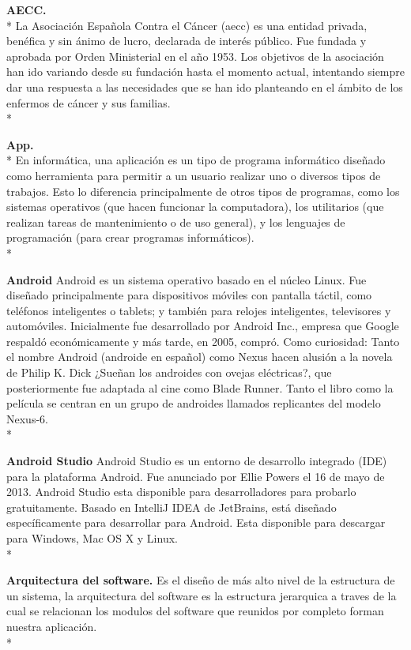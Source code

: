 \documentclass[../pfc.tex]{subfiles}
\begin{document}
	
	\textbf{AECC.}\\*
	La Asociación Española Contra el Cáncer (aecc) es una entidad privada, benéfica y sin ánimo de lucro, declarada de interés público. Fue fundada y aprobada por Orden Ministerial en el año 1953.
	Los objetivos de la asociación han ido variando desde su fundación hasta el momento actual, intentando siempre dar una respuesta a las necesidades que se han ido planteando en el ámbito de los enfermos de cáncer y sus familias.\\*
	
	\textbf{App.}\\*
	En informática, una aplicación es un tipo de programa informático diseñado como herramienta para permitir a un usuario realizar uno o diversos tipos de trabajos. Esto lo diferencia principalmente de otros tipos de programas, como los sistemas operativos (que hacen funcionar la computadora), los utilitarios (que realizan tareas de mantenimiento o de uso general), y los lenguajes de programación (para crear programas informáticos).\\*
	
	\textbf{Android}
	Android es un sistema operativo basado en el núcleo Linux. Fue diseñado principalmente para dispositivos móviles con pantalla táctil, como teléfonos inteligentes o tablets; y también para relojes inteligentes, televisores y automóviles. Inicialmente fue desarrollado por Android Inc., empresa que Google respaldó económicamente y más tarde, en 2005, compró. Como curiosidad: Tanto el nombre Android (androide en español) como Nexus hacen alusión a la novela de Philip K. Dick ¿Sueñan los androides con ovejas eléctricas?, que posteriormente fue adaptada al cine como Blade Runner. Tanto el libro como la película se centran en un grupo de androides llamados replicantes del modelo Nexus-6.\\*
	
	\textbf{Android Studio}
	Android Studio es un entorno de desarrollo integrado (IDE) para la plataforma Android. Fue anunciado por Ellie Powers el 16 de mayo de 2013. Android Studio esta disponible para desarrolladores para probarlo gratuitamente. Basado en IntelliJ IDEA de JetBrains, está diseñado específicamente para desarrollar para Android. Esta disponible para descargar para Windows, Mac OS X y Linux.\\*
	
	\textbf{Arquitectura del software.}
	Es el diseño de más alto nivel de la estructura de un sistema, la arquitectura del software es la estructura jerarquica a traves de la cual se relacionan los modulos del software que reunidos por completo forman nuestra aplicación.\\*
	
\end{document}
